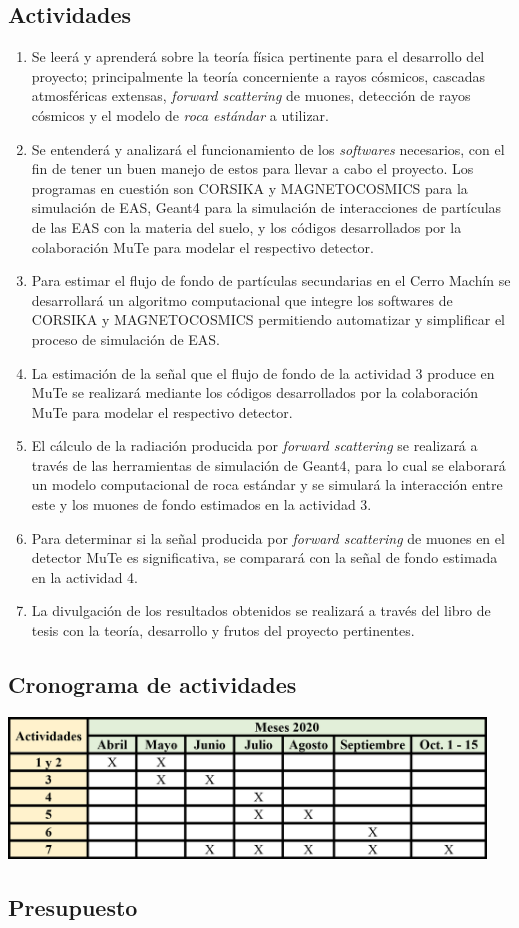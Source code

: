 \documentclass[12pt]{report}
\begin{document}
\subsection*{Actividades}
\begin{enumerate}
    \item Se leerá y aprenderá sobre la teoría física pertinente para el desarrollo del proyecto; principalmente la teoría concerniente a rayos cósmicos, cascadas atmosféricas extensas, \textit{forward scattering} de muones, detección de rayos cósmicos y el modelo de \textit{roca estándar} a utilizar.
    \item Se entenderá y analizará el funcionamiento de los \textit{softwares} necesarios, con el fin de tener un buen manejo de estos para llevar a cabo el proyecto. Los programas en cuestión son CORSIKA y MAGNETOCOSMICS para la simulación de EAS, Geant4 para la simulación de interacciones de partículas de las EAS con la materia del suelo, y los códigos desarrollados por la colaboración MuTe para modelar el respectivo detector.
    \item Para estimar el flujo de fondo de partículas secundarias en el Cerro Machín se desarrollará un algoritmo computacional que integre los softwares de CORSIKA y MAGNETOCOSMICS permitiendo automatizar y simplificar el proceso de simulación de EAS.
    \item La estimación de la señal que el flujo de fondo de la actividad 3 produce en MuTe se realizará mediante los códigos desarrollados por la colaboración MuTe para modelar el respectivo detector.
    \item El cálculo de la radiación producida por \textit{forward scattering} se realizará a través de las herramientas de simulación de Geant4, para lo cual se elaborará un modelo computacional de roca estándar y se simulará la interacción entre este y los muones de fondo estimados en la actividad 3.
    \item Para determinar si la señal producida por \textit{forward scattering} de muones en el detector MuTe es significativa, se comparará con la señal de fondo estimada en la actividad 4.
    \item La divulgación de los resultados obtenidos se realizará a través del libro de tesis con la teoría, desarrollo y frutos del proyecto pertinentes.
\end{enumerate}

\subsection*{Cronograma de actividades}
\begin{center}
    \includegraphics[width=0.95\textwidth]{images/cronograma.png}
\end{center}


\subsection*{Presupuesto}




\printbibliography
\end{document}
